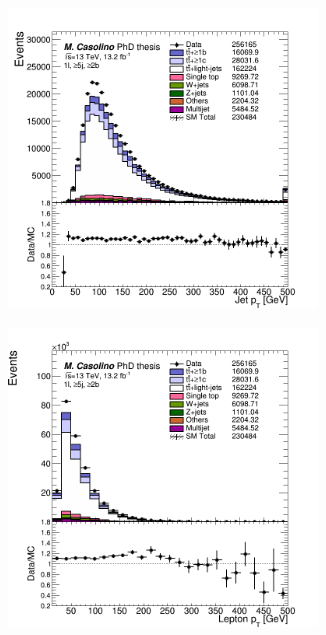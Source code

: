 \begin{figure}[p]
\begin{subfigure}{0.33\textwidth}
  \caption{}
  \label{}
\end{subfigure}
\begin{subfigure}{0.33\textwidth}
  \centering
  \includegraphics[width=0.9\textwidth]{figures/VLQ/presel/1lep/canv_c1l2b_jet0_pt.png}
  \caption{}
  \label{}
\end{subfigure}
\begin{subfigure}{0.33\textwidth}
  \centering
  \includegraphics[width=0.9\textwidth]{figures/VLQ/presel/1lep/canv_c1l2b_lep0_pt_zoom.png}

\end{subfigure}
\end{figure}
